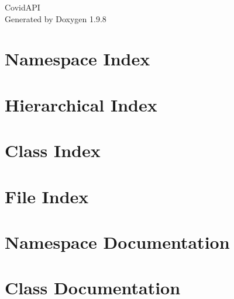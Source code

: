 \documentclass[twoside]{book}
\newcommand{\+}{\discretionary{\mbox{\scriptsize$\hookleftarrow$}}{}{}}
\newcommand{\clearemptydoublepage}{%
    \newpage{\pagestyle{empty}\cleardoublepage}%
  }
\begin{document}
  \raggedbottom
  \begin{titlepage}
  \vspace*{7cm}
  \begin{center}%
  {\Large Covid\+API}\\
  \vspace*{1cm}
  {\large Generated by Doxygen 1.9.8}\\
  \end{center}
  \end{titlepage}
  \clearemptydoublepage
  \tableofcontents
  \clearemptydoublepage
\chapter{Namespace Index}

\chapter{Hierarchical Index}

\chapter{Class Index}

\chapter{File Index}

\chapter{Namespace Documentation}




\chapter{Class Documentation}



























\end{document}
